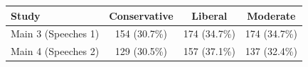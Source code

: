 \begin{table}
\fontsize{12.0pt}{14.4pt}\selectfont
\begin{tabular*}{\linewidth}{@{\extracolsep{\fill}}lccc}
\toprule
Study & Conservative & Liberal & Moderate \\ 
\midrule\addlinespace[2.5pt]
Main 3 (Speeches 1) & 154 (30.7\%) & 174 (34.7\%) & 174 (34.7\%) \\ 
Main 4 (Speeches 2) & 129 (30.5\%) & 157 (37.1\%) & 137 (32.4\%) \\ 
\bottomrule
\end{tabular*}
\end{table}

